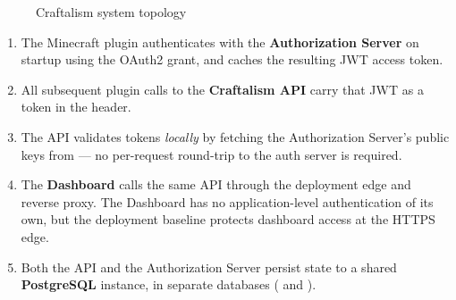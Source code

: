 \begin{figure}[h]
\centering
{}
\caption{Craftalism system topology}
\label{fig:system-topology}
\end{figure}

\begin{enumerate}
  \item The Minecraft plugin authenticates with the \textbf{Authorization Server} on startup using the  OAuth2 grant, and caches the resulting JWT access token.
  \item All subsequent plugin calls to the \textbf{Craftalism API} carry that JWT as a  token in the  header.
  \item The API validates tokens \emph{locally} by fetching the Authorization Server's public keys from  — no per-request round-trip to the auth server is required.
  \item The \textbf{Dashboard} calls the same API through the deployment edge and reverse proxy. The Dashboard has no application-level authentication of its own, but the deployment baseline protects dashboard access at the HTTPS edge.
  \item Both the API and the Authorization Server persist state to a shared \textbf{PostgreSQL} instance, in separate databases ( and ).
\end{enumerate}

